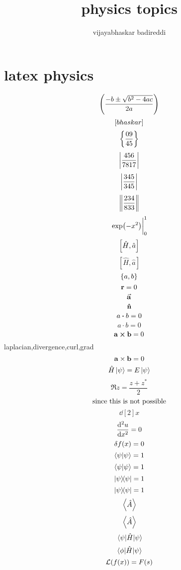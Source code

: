 \documentclass[12pt]{article}
\title{physics topics}
\author{vijayabhaskar badireddi}
\begin{document}

\section*{latex physics}

\[\pqty{\frac{-b\pm\sqrt{b^2-4ac}}{2a}}\]
\[\bqty{bhaskar}\]
\[\Bqty{\frac{09}{45}}\]
\[\vqty{\frac{456}{7817}}\]
\[\abs{\frac{345}{345}}\]
\[\norm{\frac{234}{833}}\]
\[\eval{\exp(-x^2)}_{0}^{1}\]
\[\comm{\hat{H}}{\hat{a}}\]
\[[\hat{H},\hat{a}]\]
\[\pb{a}{b}\]
\[\vb{r}=0\]
\[\va{a}\]
\[\vu{n}\]
\[{a}\vdot{b}=0\]
\[a\cdot{b}=0\]
\[\vb{a}\cp\vb{b}=0\]
laplacian,divergence,curl,grad
\[\vb{a}\times\vb{b}=0\]
\[\hat{H}\ket{\psi}=E\ket{\psi}\]
\[\Re{z}=\frac{z+z^*}{2}\]
\[\qq{since this is not possible}\]
\[\dd[2]{x}\]
\[\dv[2]{u}{x}=0\]
\[\var{f(x)}=0\]
\[\braket{\psi}=1\]
\[\ip{\psi}=1\]
\[\op{\psi}=1\]
\[\ketbra{\psi}=1\]
\[\ev{\hat{A}}\]
\[\expval{\hat{A}}\]
\[\expval{\hat{H}}{\psi}\]
\[\mel{\phi}{\hat{H}}{\psi}\]
\[\mathcal{L}\qty(f(x))=F(s)\]
\end{document}
